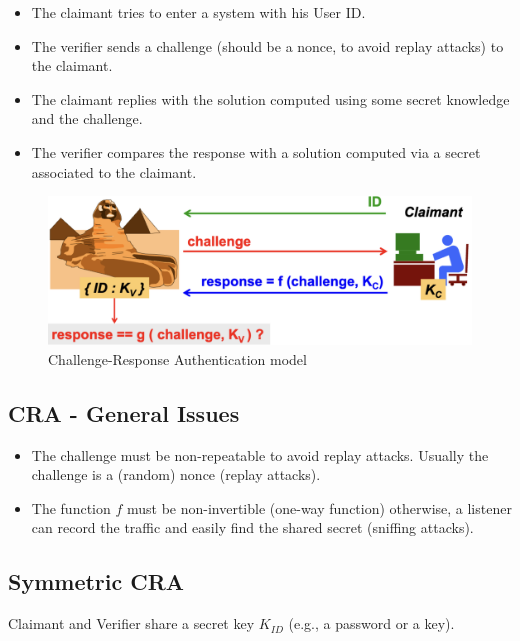 \begin{multicols}{2}
\begin{itemize}
    \item The claimant tries to enter a system with his User ID.
    \item The verifier sends a challenge (should be a nonce, to avoid replay attacks) to the claimant.
    \item The claimant replies with the solution computed using some secret knowledge and the challenge.
    \item The verifier compares the response with a solution computed  via a secret associated to the claimant.
\end{itemize}

\columnbreak

    \begin{figure}[H]
        \centering
        \includegraphics[width=\linewidth]{Images/Authentication/CRA.png}
        \caption{Challenge-Response Authentication model}
    \end{figure}
\end{multicols}

\subsection*{CRA - General Issues}
\begin{itemize}
    \item The challenge must be non-repeatable to avoid replay attacks. Usually the challenge is a (random) nonce (replay attacks).
    \item The function $f$ must be non-invertible (one-way function) otherwise, a listener can record the traffic and easily find the shared secret (sniffing attacks).
\end{itemize}

\subsection{Symmetric CRA}
Claimant and Verifier share a secret key \(K_{ID}\) (e.g., a password or a key).


